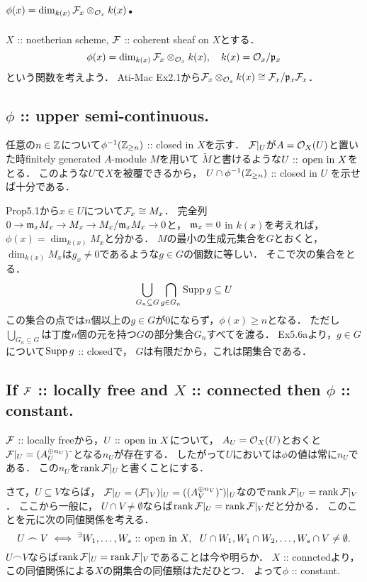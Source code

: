 \documentclass[a4paper]{jsarticle}
\begin{document}
\section{$\phi(x)=\dim_{k(x)} \mathcal{F}_x \otimes_{\mathcal{O}_x} k(x)$.} %
    $X$ :: noetherian scheme, $\mathcal{F}$ :: coherent sheaf on $X$とする．
    \[ \phi(x)=\dim_{k(x)} \mathcal{F}_x \otimes_{\mathcal{O}_x} k(x),~~~ k(x)=\mathcal{O}_x/\mathfrak{p}_x \]
    という関数を考えよう．
    Ati-Mac Ex2.1から$\mathcal{F}_x \otimes_{\mathcal{O}_x} k(x) \cong \mathcal{F}_x/\mathfrak{p}_x \mathcal{F}_x$．

    \subsection{$\phi$ :: upper semi-continuous.}
    任意の$n \in \mathbb{Z}$について$\phi^{-1}(\mathbb{Z}_{\geq n})$ :: closed in $X$を示す．
    $\mathcal{F}|_U$が$A=\mathcal{O}_X(U)$と置いた時finitely generated $A$-module $M$を用いて
    $\tilde{M}$と書けるような$U \text{ :: open in } X$をとる．
    このような$U$で$X$を被覆できるから，
    $U \cap \phi^{-1}(\mathbb{Z}_{\geq n})$ :: closed in $U$
    を示せば十分である．

    Prop5.1から$x \in U$について$\mathcal{F}_x \cong M_x$．
    完全列$0 \to \mathfrak{m}_x M_x \to M_x \to M_x/\mathfrak{m}_x M_x \to 0$と，
    $\mathfrak{m}_x=0$ in $k(x)$を考えれば，
    $\phi(x)=\dim_{k(x)} M_x$と分かる．
    $M$の最小の生成元集合を$G$とおくと，
    $\dim_{k(x)} M_x$は$g_x \neq 0$であるような$g \in G$の個数に等しい．
    そこで次の集合をとる．
    \[ \bigcup_{G_n \subseteq G} \bigcap_{g \in G_n} \operatorname{Supp} g \subseteq U \]
    この集合の点では$n$個以上の$g \in G$が$0$にならず，$\phi(x) \geq n$となる．
    ただし$\bigcup_{G_n \subseteq G}$は丁度$n$個の元を持つ$G$の部分集合$G_n$すべてを渡る．
    Ex5.6aより，$g \in G$について$\operatorname{Supp} g$ :: closedで，
    $G$は有限だから，これは閉集合である．

    \subsection{If $\mathcal{F}$ :: locally free and $X$ :: connected then $\phi$ :: constant.}
    $\mathcal{F}$ :: locally freeから，$U \text{ :: open in } X$について，
    $A_U=\mathcal{O}_X(U)$とおくと$\mathcal{F}|_U=(A_U^{\oplus n_U})\,\tilde{}\,$となる$n_U$が存在する．
    したがって$U$においては$\phi$の値は常に$n_U$である．
    この$n_U$を$\operatorname{rank} \mathcal{F}|_U$と書くことにする．

    さて，$U \subseteq V$ならば，
    $\mathcal{F}|_U=(\mathcal{F}|_V)|_U=((A_V^{\oplus n_V})\,\tilde{}\,)|_U$なので$\operatorname{rank} \mathcal{F}|_U=\operatorname{rank} \mathcal{F}|_V$．
    ここから一般に，
    $U \cap V \neq \emptyset$ならば$\operatorname{rank} \mathcal{F}|_U=\operatorname{rank} \mathcal{F}|_V$だと分かる．
    このことを元に次の同値関係を考える．
    \[ U \frown V \iff {}^{\exists} W_1,\dots,W_s \text{ :: open in } X,~~ U \cap W_1, W_1 \cap W_2, \dots, W_s \cap V \neq \emptyset. \]
    $U \frown V$ならば$\operatorname{rank} \mathcal{F}|_U=\operatorname{rank} \mathcal{F}|_V$であることは今や明らか．
    $X$ :: connctedより，この同値関係による$X$の開集合の同値類はただひとつ．
    よって$\phi$ :: constant.
\end{document}
